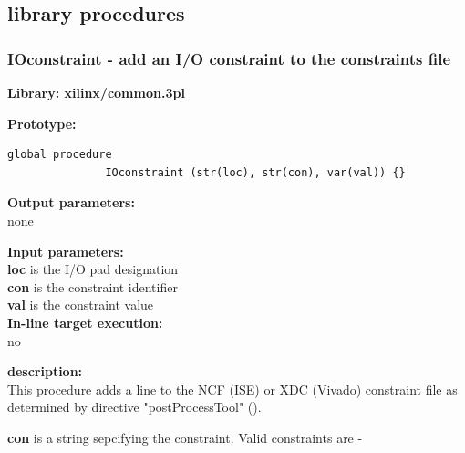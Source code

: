     \subsection{library procedures}

        
        
        \subsubsection{IOconstraint - add an I/O constraint to the constraints file}\label{sec:lpioconstraint}

            
            {\bf Library: xilinx/common.3pl}

            {\bf Prototype:} \\
            \vsp
            \begin{lstlisting}[gobble=12, language=threepl]
               global procedure
               IOconstraint (str(loc), str(con), var(val)) {}
            \end{lstlisting}

            {\bf Output parameters:} \\
            none

            {\bf Input parameters:} \\            
            {\bf loc} is the I/O pad designation \\
            {\bf con} is the constraint identifier \\
            {\bf val} is the constraint value \\
        
            {\bf In-line target execution:} \\
            no

            {\bf description:} \\
            This procedure adds a line to the NCF (ISE) or XDC (Vivado) constraint
            file as determined by directive "postProcessTool" ().
            
            {\bf con} is a string sepcifying the constraint. Valid constraints are -

